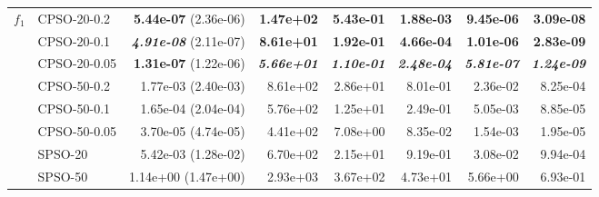\documentclass[a4paper,twoside]{article}
\begin{document}
\begin{table}
\begin{tabular}{|| l | l | r | r | r | r | r | r ||}
$f_1$   &  CPSO-20-0.2    &  {\bf 5.44e-07} (2.36e-06)         &  {\bf 1.47e+02}         &  {\bf 5.43e-01}         &  {\bf 1.88e-03}         &  {\bf 9.45e-06}         &  {\bf 3.09e-08}  \\
    \cline{2-8}
        &  CPSO-20-0.1    &  {\bf \emph{4.91e-08}} (2.11e-07)  &  {\bf 8.61e+01}         &  {\bf 1.92e-01}         &  {\bf 4.66e-04}         &  {\bf 1.01e-06}         &  {\bf 2.83e-09}  \\
    \cline{2-8}    
        &  CPSO-20-0.05   &  {\bf 1.31e-07} (1.22e-06)         &  {\bf \emph{5.66e+01}}  &  {\bf \emph{1.10e-01}}  &  {\bf \emph{2.48e-04}}  &  {\bf \emph{5.81e-07}}  &  {\bf \emph{1.24e-09}}  \\
    \cline{2-8}
        &  CPSO-50-0.2    &  1.77e-03 (2.40e-03)               &  8.61e+02               &  2.86e+01               &  8.01e-01               &  2.36e-02               &  8.25e-04  \\
    \cline{2-8}
        &  CPSO-50-0.1    &  1.65e-04 (2.04e-04)               &  5.76e+02               &  1.25e+01               &  2.49e-01               &  5.05e-03               &  8.85e-05  \\
    \cline{2-8}
        &  CPSO-50-0.05   &  3.70e-05 (4.74e-05)               &  4.41e+02               &  7.08e+00               &  8.35e-02               &  1.54e-03               &  1.95e-05  \\
\hline \hline
        &  SPSO-20        &  5.42e-03 (1.28e-02)               &  6.70e+02               &  2.15e+01               &  9.19e-01               &  3.08e-02               &  9.94e-04  \\
    \cline{2-8}
        &  SPSO-50        &  1.14e+00 (1.47e+00)               &  2.93e+03               &  3.67e+02               &  4.73e+01               &  5.66e+00               &  6.93e-01  \\

\hline \hline \hline


\end{tabular}
\end{table}
\end{document}
